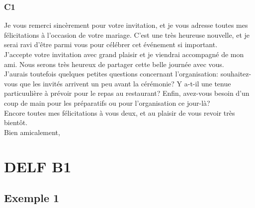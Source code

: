 \documentclass{book}
\begin{document}
        \subsection*{C1}
            Je vous remerci sincèrement pour votre invitation, et je vous adresse toutes mes félicitations à l'occasion de votre mariage.
            C'est une très heureuse nouvelle, et je serai ravi d'être parmi vous pour célébrer cet événement si important.
            \\
            J'accepte votre invitation avec grand plaisir et je viendrai accompagné de mon ami.
            Nous serons très heureux de partager cette belle journée avec vous.
            \\
            J'aurais toutefois quelques petites questions concernant l'organisation: 
            souhaitez-vous que les invités arrivent un peu avant la cérémonie?
            Y a-t-il une tenue particuulière à prévoir pour le repas au restaurant? 
            Enfin, avez-vous besoin d'un coup de main pour les préparatifs ou pour l'organisation ce jour-là?
            \\
            Encore toutes mes félicitations à vous deux, et au plaisir de vous revoir très bientôt.
            \\
            Bien amicalement,

\chapter{DELF B1}
    \section{Exemple 1}
\end{document}
